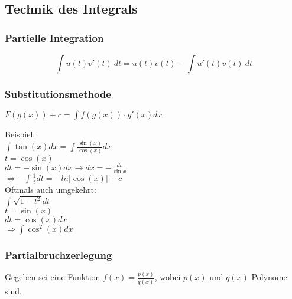 \documentclass[10pt, a4paper, twocolumn]{scrartcl}
\begin{document}
\subsection{Technik des Integrals}

\subsubsection{Partielle Integration}

$$\int u(t)v'(t)\:dt = u(t)v(t) - \int u'(t)v(t)\:dt$$

\subsubsection{Substitutionsmethode}

$F(g(x))+c=\int f(g(x))\cdotp g'(x) dx$

Beispiel:\\
$\int \tan(x) dx=\int \frac{\sin(x)}{\cos(x)}dx$\\
$t=\cos(x)$\\
$dt = -\sin (x)dx\rightarrow dx=-\frac{dt}{\sin x}$\\
$\Rightarrow-\int\frac{1}{t}dt=-ln|\cos (x)| + c$\\

Oftmals auch umgekehrt:\\
$\int \sqrt{1-t^2}dt$\\
$t=\sin (x)$\\
$dt=\cos (x)dx$\\
$\Rightarrow\int \cos^2(x)dx$

\subsubsection{Partialbruchzerlegung}

Gegeben sei eine Funktion $f(x)=\frac{p(x)}{q(x)}$, wobei $p(x)$ und $q(x)$ Polynome sind.\\
\end{document}
